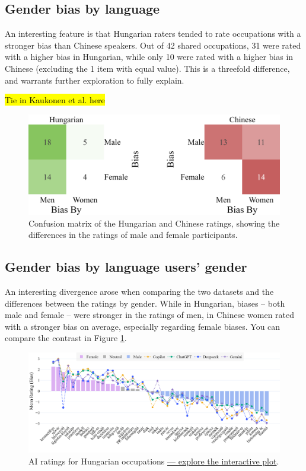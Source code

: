 \documentclass[11pt]{article}
\begin{document}
\subsection{Gender bias by language}

An interesting feature is that Hungarian raters tended to rate occupations with a stronger bias than Chinese speakers. Out of 42 shared occupations, 31 were rated with a higher bias in Hungarian, while only 10 were rated with a higher bias in Chinese (excluding the 1 item with equal value). This is a threefold difference, and warrants further exploration to fully explain.

\hl{Tie in Kaukonen et al. here}

\begin{figure}[ht]
  \centering
  \includegraphics[width=\linewidth]{../confusion_matrices}
  \caption{Confusion matrix of the Hungarian and Chinese ratings, showing the differences in the ratings of male and female participants.}  
  \label{fig:confusion_matrices}
\end{figure}

\subsection{Gender bias by language users' gender}

An interesting divergence arose when comparing the two datasets and the differences between the ratings by gender. While in Hungarian, biases -- both male and female -- were stronger in the ratings of men, in Chinese women rated with a stronger bias on average, especially regarding female biases. You can compare the contrast in Figure \ref{fig:confusion_matrices}.


\begin{figure}[!ht]
  \centering
  \includegraphics[width=\linewidth]{../occupations_hu_with_ai}
  \caption{AI ratings for Hungarian occupations \href{https://htmlpreview.github.io/?https://github.com/partigabor/occupational-bias/blob/main/occupations_hu_with_ai.html}{--- explore the interactive plot}.}
  \label{fig:occupations_hu_with_ai}
\end{figure}
\end{document}
